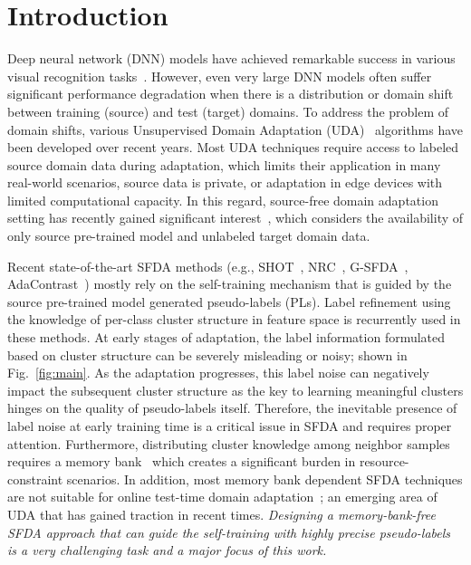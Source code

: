 \documentclass[10pt,twocolumn,letterpaper]{article}
\begin{document}
\section{Introduction}
\label{sec:intro}
\vspace{-1mm}
Deep neural network (DNN) models have achieved remarkable success in various visual recognition tasks~\cite{liang2020polytransform,he2016deep,dosovitskiy2020image,liu2022adaptive}. However, even very large DNN models often suffer significant performance degradation when there is a distribution or domain shift~\cite{xia2020structure, peng2019moment} between training (source) and test (target) domains. To address the problem of domain shifts, various Unsupervised Domain Adaptation (UDA)~\cite{RSDA,CAN} algorithms have been developed over recent years. Most UDA techniques require access to labeled source domain data during adaptation, which limits their application in many real-world scenarios, \eg source data is private, or adaptation in edge devices with limited computational capacity. In this regard, source-free domain adaptation setting has recently gained significant interest~\cite{universalSFDA,kundu2020towards, yang2020unsupervised}, which considers the availability of only source pre-trained model and unlabeled target domain data.


Recent state-of-the-art SFDA methods (e.g., SHOT~\cite{SHOT}, NRC~\cite{yang2021exploiting}, G-SFDA~\cite{G-SFDA}, AdaContrast~\cite{chen2022contrastive}) mostly rely on the self-training mechanism that is guided by the source pre-trained model generated pseudo-labels (PLs). Label refinement using the knowledge of per-class cluster structure in feature space is recurrently used in these methods. At early stages of adaptation, the label information formulated based on cluster structure can be severely misleading or noisy; shown in Fig.~\ref{fig:main}. As the adaptation progresses, this label noise can negatively impact the subsequent cluster structure as the key to learning meaningful clusters hinges on the quality of pseudo-labels itself. Therefore, the inevitable presence of label noise at early training time is a critical issue in SFDA and requires proper attention. Furthermore, distributing cluster knowledge among neighbor samples requires a memory bank~\cite{chen2022contrastive, SHOT} which creates a significant burden in resource-constraint scenarios. In addition, most memory bank dependent SFDA techniques are not suitable for online test-time domain adaptation~\cite{wang2021tent,wang2022continual}; an emerging area of UDA that has gained traction in recent times.
\emph{Designing a memory-bank-free SFDA approach that can guide the self-training with highly precise pseudo-labels is a very challenging task and a major focus of this work.}
\end{document}
